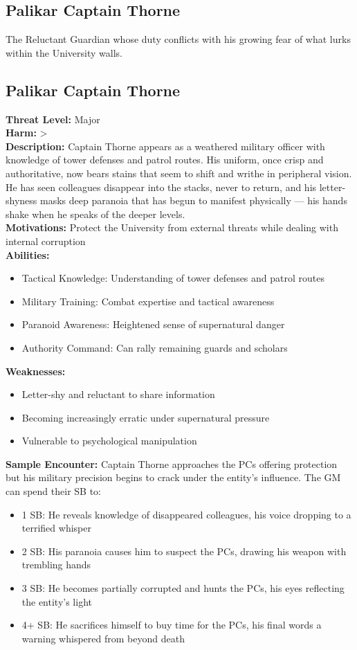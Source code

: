 \documentclass[11pt]{article}
\newenvironment{monsterentry}[1]{%
  \begin{mdframed}[backgroundcolor=shadecolor, linewidth=0pt, leftmargin=0pt, rightmargin=0pt]%
  \subsection*{#1}%
}{%
  \end{mdframed}%
}
\begin{document}
\subsection{Palikar Captain Thorne}

The Reluctant Guardian whose duty conflicts with his growing fear of what lurks within the University walls.

\begin{monsterentry}{Palikar Captain Thorne}
\textbf{Threat Level:} Major \\
\textbf{Harm:} \textgreater \\
\textbf{Description:} Captain Thorne appears as a weathered military officer with knowledge of tower defenses and patrol routes. His uniform, once crisp and authoritative, now bears stains that seem to shift and writhe in peripheral vision. He has seen colleagues disappear into the stacks, never to return, and his letter-shyness masks deep paranoia that has begun to manifest physically --- his hands shake when he speaks of the deeper levels. \\
\textbf{Motivations:} Protect the University from external threats while dealing with internal corruption \\
\textbf{Abilities:}
\begin{itemize}
    \item Tactical Knowledge: Understanding of tower defenses and patrol routes
    \item Military Training: Combat expertise and tactical awareness
    \item Paranoid Awareness: Heightened sense of supernatural danger
    \item Authority Command: Can rally remaining guards and scholars
\end{itemize}
\textbf{Weaknesses:}
\begin{itemize}
    \item Letter-shy and reluctant to share information
    \item Becoming increasingly erratic under supernatural pressure
    \item Vulnerable to psychological manipulation
\end{itemize}
\textbf{Sample Encounter:} Captain Thorne approaches the PCs offering protection but his military precision begins to crack under the entity's influence. The GM can spend their SB to:
\begin{itemize}
    \item 1 SB: He reveals knowledge of disappeared colleagues, his voice dropping to a terrified whisper
    \item 2 SB: His paranoia causes him to suspect the PCs, drawing his weapon with trembling hands
    \item 3 SB: He becomes partially corrupted and hunts the PCs, his eyes reflecting the entity's light
    \item 4+ SB: He sacrifices himself to buy time for the PCs, his final words a warning whispered from beyond death
\end{itemize}
\end{monsterentry}
\end{document}
